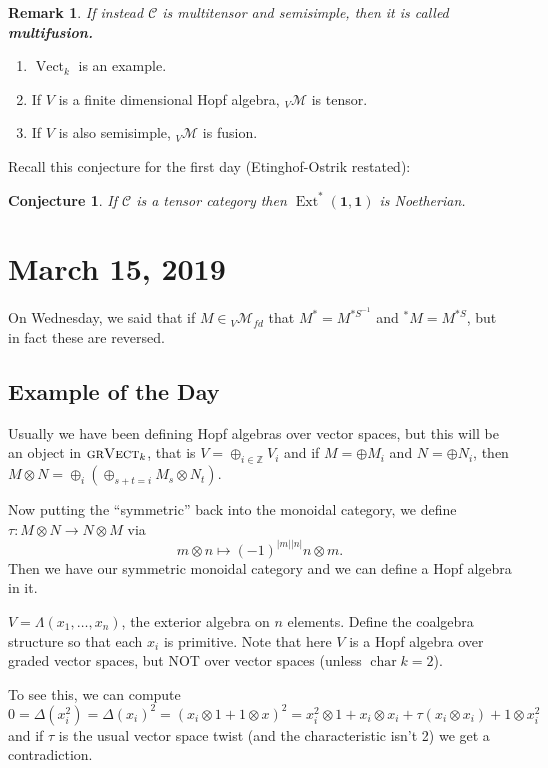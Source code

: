 \documentclass[12pt]{article}
\theoremstyle{break}
\theoremstyle{nonumberbreak}
\theoremstyle{changebreak}
\theoremstyle{break}
\theoremstyle{nonumberbreak}
\theoremstyle{nonumberplain}
\newtheorem{conj}{Conjecture}
\theoremstyle{change}
\newtheorem{rmk}[thm]{Remark}
\newcommand*{\Z}{
\mathbb{Z}
}
\DeclareMathOperator{\Ext}{Ext}
\DeclareMathOperator{\ch}{char}
\newcommand*{\Vectk}{\operatorname{Vect}_k}
\newcommand*{\calM}{\mathcal{M}}
\begin{document}
\begin{rmk}
	If instead $\mathscr C$ is multitensor and semisimple, then it is called \textbf{multifusion.}
\end{rmk}
\begin{ex}
	\begin{enumerate}
		\item $\Vectk$ is an example.
		\item If $V$ is a finite dimensional Hopf algebra, ${_V\calM}$ is tensor.
		\item If $V$ is also semisimple, ${_V\calM}$ is fusion.
	\end{enumerate}
\end{ex}
Recall this conjecture for the first day (Etinghof-Ostrik restated):
\begin{conj}
	If $\mathscr C$ is a tensor category then $\Ext^*(\mathbf{1},\mathbf{1})$ is Noetherian.
\end{conj}

\section{March 15, 2019}
On Wednesday, we said that if $M\in{_V\calM_{fd}}$ that $M^*=M^{*S^{-1}}$ and ${^*M}=M^{*S}$,
but in fact these are reversed.
\subsection{Example of the Day}
\begin{ex}
	Usually we have been defining Hopf algebras over vector spaces, but this will be an object in $\text{\sc grVect}_k$,
	that is $V=\oplus_{i\in\Z}V_i$ and if $M=\oplus M_i$ and $N=\oplus N_i$, then $M\otimes N=\oplus_i(\oplus_{s+t=i}M_s\otimes N_t)$.

	Now putting the ``symmetric'' back into the monoidal category, we define $\tau:M\otimes N\to N\otimes M$ via
	\[m\otimes n\mapsto (-1)^{|m||n|}n\otimes m.\]
	Then we have our symmetric monoidal category and we can define a Hopf algebra in it.

	$V=\Lambda(x_1,\dots,x_n)$, the exterior algebra on $n$ elements. Define the coalgebra structure 
	so that each $x_i$ is primitive. Note that here $V$ is a Hopf algebra over graded vector spaces, but 
	NOT over vector spaces (unless $\ch k=2$).

	To see this, we can compute 
	\[0=\Delta(x_i^2)=\Delta(x_i)^2=(x_i\otimes 1+1\otimes x)^2=x_i^2\otimes 1+x_i\otimes x_i+\tau(x_i\otimes x_i)+1\otimes x_i^2\]
	and if $\tau$ is the usual vector space twist (and the characteristic isn't 2) we get a contradiction.
\end{ex}
\end{document}
